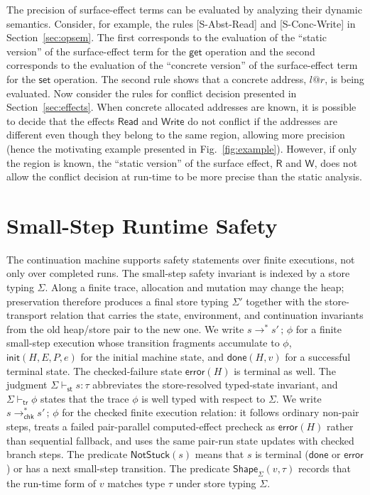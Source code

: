 \documentclass[10pt,a4paper]{article}
\makeatletter
\newcommand{\Read}{\mathsf{Read}}
\newcommand{\Write}{\mathsf{Write}}
\newcommand{\Rs}{\mathsf{R}}
\newcommand{\Ws}{\mathsf{W}}
\newcommand{\at}{\mathord{@}}
\newcommand{\chksteps}{\mathrel{\longrightarrow^{*}_{\mathsf{chk}}}}
\makeatother
\begin{document}
The precision of surface-effect terms can be evaluated by analyzing their
dynamic semantics. Consider, for example, the rules [S-Abst-Read] and
[S-Conc-Write] in Section~\ref{sec:opsem}. The first corresponds to the
evaluation of the ``static version'' of the surface-effect term for the
$\mathsf{get}$ operation and the second corresponds to the evaluation of the
``concrete version'' of the surface-effect term for the $\mathsf{set}$ operation.
The second rule shows that a concrete address, $l\at r$, is being evaluated.
Now consider the rules for conflict decision presented in
Section~\ref{sec:effects}. When concrete allocated addresses are known, it is
possible to decide that the effects $\Read$ and $\Write$ do not conflict if
the addresses are different even though they belong to the same region,
allowing more precision (hence the motivating example presented in
Fig.~\ref{fig:example}). However, if only the region is known, the ``static
version'' of the surface effect, $\Rs$ and $\Ws$, does not allow the conflict decision
at run-time to be more precise than the static analysis.

\section{Small-Step Runtime Safety}
\label{sec:smallstep}

The continuation machine supports safety statements over finite executions,
not only over completed runs. The small-step safety invariant is indexed by a store typing
$\Sigma$. Along a finite trace, allocation and mutation may change the heap;
preservation therefore produces a final store typing $\Sigma'$ together with
the store-transport relation that carries the state, environment, and
continuation invariants from the old heap/store pair to the new one. We write
$s\longrightarrow^{*} s'\,;\,\phi$ for a finite small-step execution whose
transition fragments accumulate to $\phi$, $\mathsf{init}(H,E,P,e)$ for the initial machine state,
and $\mathsf{done}(H,v)$ for a successful terminal state. The checked-failure
state $\mathsf{error}(H)$ is terminal as well. The judgment
$\Sigma \vdash_{\mathsf{st}} s : \tau$ abbreviates the store-resolved
typed-state invariant, and $\Sigma \vdash_{\mathsf{tr}} \phi$ states that the
trace $\phi$ is well typed with respect to $\Sigma$.
We write $s\chksteps s'\,;\,\phi$ for the checked finite execution relation:
it follows ordinary non-pair steps, treats a failed pair-parallel computed-effect
precheck as $\mathsf{error}(H)$ rather than sequential fallback, and uses the
same pair-run state updates with checked branch steps.
The predicate $\mathsf{NotStuck}(s)$ means that $s$ is terminal
($\mathsf{done}$ or $\mathsf{error}$) or has a next small-step transition. The
predicate $\mathsf{Shape}_{\Sigma}(v,\tau)$ records
that the run-time form of $v$ matches type $\tau$ under store typing $\Sigma$.
\end{document}
